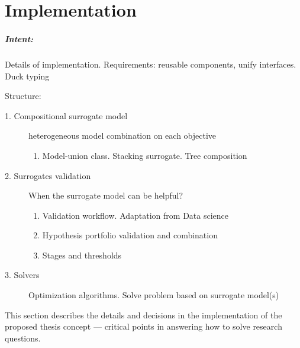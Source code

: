 \chapter{Implementation}

\begin{blockquote}
    \paragraph{Intent:} Details of implementation. Requirements: reusable components, unify interfaces. Duck typing 
    
    Structure:
    \begin{description}

        \item[1. Compositional surrogate model] heterogeneous model combination on each objective
        \begin{enumerate}
            \item Model-union class. Stacking surrogate. Tree composition
        \end{enumerate}

        \item[2. Surrogates validation] When the surrogate model can be helpful?
        \begin{enumerate}
            \item Validation workflow. Adaptation from Data science
            \item Hypothesis portfolio validation and combination
            \item Stages and thresholds
        \end{enumerate}

        \item[3. Solvers] Optimization algorithms. Solve problem based on surrogate model(s)
    \end{description}
\end{blockquote}

This section describes the details and decisions in the implementation of the proposed thesis concept — critical points in answering how to solve research questions.

